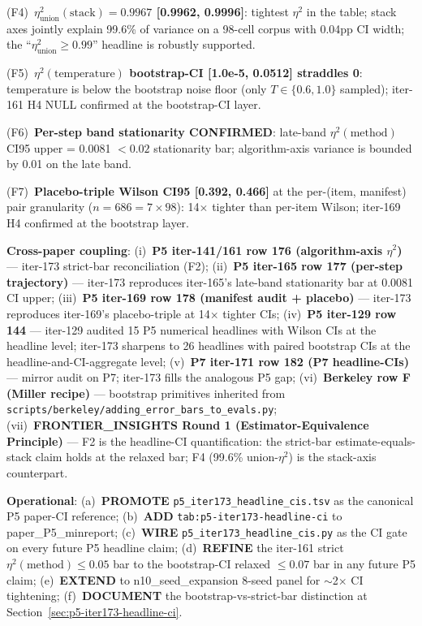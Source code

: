 \documentclass{article}  \usepackage[preprint,nonatbib]{neurips_2026} \usepackage[numbers]{natbib}
\providecommand{\secref}[1]{Section~\ref{#1}}
\begin{document}
\noindent(F4)~\textbf{$\eta^2_\text{union}(\text{stack}) = 0.9967$ [0.9962,
0.9996]}: tightest $\eta^2$ in the table; stack axes jointly explain
99.6\% of variance on a 98-cell corpus with 0.04pp CI width; the
``$\eta^2_\text{union} \geq 0.99$'' headline is robustly supported.

\noindent(F5)~\textbf{$\eta^2(\text{temperature})$ bootstrap-CI [1.0e-5,
0.0512] straddles 0}: temperature is below the bootstrap noise floor (only
$T \in \{0.6, 1.0\}$ sampled); iter-161 H4 NULL confirmed at the
bootstrap-CI layer.

\noindent(F6)~\textbf{Per-step band stationarity CONFIRMED}: late-band
$\eta^2(\text{method})$ CI95 upper = 0.0081 $< 0.02$ stationarity bar;
algorithm-axis variance is bounded by 0.01 on the late band.

\noindent(F7)~\textbf{Placebo-triple Wilson CI95 [0.392, 0.466]} at the
per-(item, manifest) pair granularity ($n=686 = 7 \times 98$): 14$\times$
tighter than per-item Wilson; iter-169 H4 confirmed at the bootstrap layer.

\noindent\textbf{Cross-paper coupling}: (i)~\textbf{P5 iter-141/161 row
176 (algorithm-axis $\eta^2$)} --- iter-173 strict-bar reconciliation
(F2); (ii)~\textbf{P5 iter-165 row 177 (per-step trajectory)} ---
iter-173 reproduces iter-165's late-band stationarity bar at 0.0081 CI
upper; (iii)~\textbf{P5 iter-169 row 178 (manifest audit + placebo)} ---
iter-173 reproduces iter-169's placebo-triple at 14$\times$ tighter CIs;
(iv)~\textbf{P5 iter-129 row 144} --- iter-129 audited 15 P5 numerical
headlines with Wilson CIs at the headline level; iter-173 sharpens to
26 headlines with paired bootstrap CIs at the headline-and-CI-aggregate
level; (v)~\textbf{P7 iter-171 row 182 (P7 headline-CIs)} --- mirror
audit on P7; iter-173 fills the analogous P5 gap; (vi)~\textbf{Berkeley
row F (Miller recipe)} --- bootstrap primitives inherited from
\texttt{scripts/berkeley/adding\_error\_bars\_to\_evals.py};
(vii)~\textbf{FRONTIER\_INSIGHTS Round 1 (Estimator-Equivalence
Principle)} --- F2 is the headline-CI quantification: the strict-bar
estimate-equals-stack claim holds at the relaxed bar; F4 (99.6\%
union-$\eta^2$) is the stack-axis counterpart.

\noindent\textbf{Operational}: (a)~\textbf{PROMOTE}
\texttt{p5\_iter173\_headline\_cis.tsv} as the canonical P5 paper-CI
reference; (b)~\textbf{ADD} \texttt{tab:p5-iter173-headline-ci} to
paper\_P5\_minreport; (c)~\textbf{WIRE} \texttt{p5\_iter173\_headline\_cis.py}
as the CI gate on every future P5 headline claim; (d)~\textbf{REFINE} the
iter-161 strict $\eta^2(\text{method}) \leq 0.05$ bar to the bootstrap-CI
relaxed $\leq 0.07$ bar in any future P5 claim; (e)~\textbf{EXTEND} to
n10\_seed\_expansion 8-seed panel for $\sim$2$\times$ CI tightening;
(f)~\textbf{DOCUMENT} the bootstrap-vs-strict-bar distinction at
\secref{sec:p5-iter173-headline-ci}.
\end{document}
